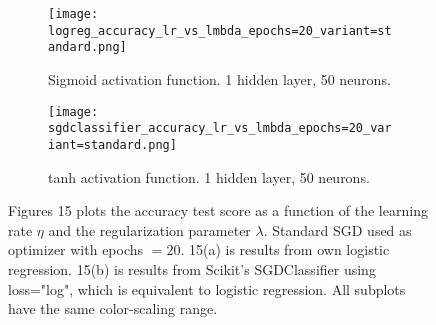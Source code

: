 \documentclass[a4paper,twocolumn]{article}
\begin{document}
\begin{figure*}[ht]
    \centering
    \begin{subfigure}[b]{\columnwidth}
        \texttt{[image: logreg\_accuracy\_lr\_vs\_lmbda\_epochs=20\_variant=standard.png]}
        \caption{Sigmoid activation function. 1 hidden layer, 50 neurons.}
        \label{fig:15a}
    \end{subfigure}\hspace{0.1cm}
    \begin{subfigure}[b]{\columnwidth}
        \texttt{[image: sgdclassifier\_accuracy\_lr\_vs\_lmbda\_epochs=20\_variant=standard.png]}
        \caption{tanh activation function. 1 hidden layer, 50 neurons.}
        \label{fig:15b}
    \end{subfigure}
    \captionsetup{width=2\columnwidth}
    \caption{Figures 15 plots the accuracy test score as a function of the learning rate $\eta$ and the regularization parameter $\lambda$. Standard SGD used as optimizer with epochs $= 20$. 15(a) is results from own logistic regression. 15(b) is results from Scikit's SGDClassifier using loss="log", which is equivalent to logistic regression. All subplots have the same color-scaling range.}
    \label{fig:15}
\end{figure*}
\newpage
\end{document}
